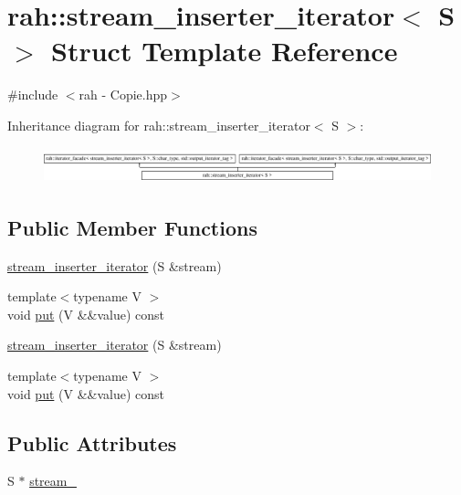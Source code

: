 \hypertarget{structrah_1_1stream__inserter__iterator}{}\section{rah\+::stream\+\_\+inserter\+\_\+iterator$<$ S $>$ Struct Template Reference}
\label{structrah_1_1stream__inserter__iterator}


{\ttfamily \#include $<$rah -\/ Copie.\+hpp$>$}

Inheritance diagram for rah\+::stream\+\_\+inserter\+\_\+iterator$<$ S $>$\+:\begin{figure}[H]
\begin{center}
\leavevmode
\includegraphics[height=1.042830cm]{structrah_1_1stream__inserter__iterator}
\end{center}
\end{figure}
\subsection*{Public Member Functions}
\begin{DoxyCompactItemize}
\item 
\mbox{\hyperlink{structrah_1_1stream__inserter__iterator_a0b096d8edfc691c1fdadd919252ce87d}{stream\+\_\+inserter\+\_\+iterator}} (S \&stream)
\item 
{\footnotesize template$<$typename V $>$ }\\void \mbox{\hyperlink{structrah_1_1stream__inserter__iterator_a449c0bfdb9f253260430c0184ef370fe}{put}} (V \&\&value) const
\item 
\mbox{\hyperlink{structrah_1_1stream__inserter__iterator_a0b096d8edfc691c1fdadd919252ce87d}{stream\+\_\+inserter\+\_\+iterator}} (S \&stream)
\item 
{\footnotesize template$<$typename V $>$ }\\void \mbox{\hyperlink{structrah_1_1stream__inserter__iterator_a449c0bfdb9f253260430c0184ef370fe}{put}} (V \&\&value) const
\end{DoxyCompactItemize}
\subsection*{Public Attributes}
\begin{DoxyCompactItemize}
\item 
S $\ast$ \mbox{\hyperlink{structrah_1_1stream__inserter__iterator_ab8594076013c695b314616093e8fdb4c}{stream\+\_\+}}
\end{DoxyCompactItemize}


